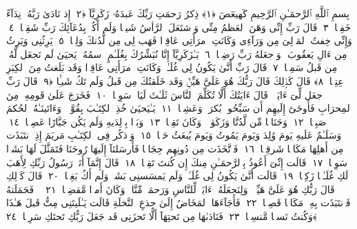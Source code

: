
  
    
  
    
    

\nopagebreak
  بِسمِ ٱللَّهِ ٱلرَّحمَـٰنِ ٱلرَّحِيمِ
  كٓهيعٓصٓ ﴿١﴾
 ذِكرُ رَحمَتِ رَبِّكَ عَبدَهُۥ زَكَرِيَّآ ﴿٢﴾
 إِذ نَادَىٰ رَبَّهُۥ نِدَآءً خَفِيًّۭا ﴿٣﴾
 قَالَ رَبِّ إِنِّى وَهَنَ ٱلعَظمُ مِنِّى وَٱشتَعَلَ ٱلرَّأسُ شَيبًۭا وَلَم أَكُنۢ بِدُعَآئِكَ رَبِّ شَقِيًّۭا ﴿٤﴾
 وَإِنِّى خِفتُ ٱلمَوَٟلِىَ مِن وَرَآءِى وَكَانَتِ ٱمرَأَتِى عَاقِرًۭا فَهَب لِى مِن لَّدُنكَ وَلِيًّۭا ﴿٥﴾
 يَرِثُنِى وَيَرِثُ مِن ءَالِ يَعقُوبَ ۖ وَٱجعَلهُ رَبِّ رَضِيًّۭا ﴿٦﴾
 يَـٰزَكَرِيَّآ إِنَّا نُبَشِّرُكَ بِغُلَـٰمٍ ٱسمُهُۥ يَحيَىٰ لَم نَجعَل لَّهُۥ مِن قَبلُ سَمِيًّۭا ﴿٧﴾
 قَالَ رَبِّ أَنَّىٰ يَكُونُ لِى غُلَـٰمٌۭ وَكَانَتِ ٱمرَأَتِى عَاقِرًۭا وَقَد بَلَغتُ مِنَ ٱلكِبَرِ عِتِيًّۭا ﴿٨﴾
 قَالَ كَذَٟلِكَ قَالَ رَبُّكَ هُوَ عَلَىَّ هَيِّنٌۭ وَقَد خَلَقتُكَ مِن قَبلُ وَلَم تَكُ شَيـًۭٔا ﴿٩﴾
 قَالَ رَبِّ ٱجعَل لِّىٓ ءَايَةًۭ ۚ قَالَ ءَايَتُكَ أَلَّا تُكَلِّمَ ٱلنَّاسَ ثَلَـٰثَ لَيَالٍۢ سَوِيًّۭا ﴿١٠﴾
 فَخَرَجَ عَلَىٰ قَومِهِۦ مِنَ ٱلمِحرَابِ فَأَوحَىٰٓ إِلَيهِم أَن سَبِّحُوا۟ بُكرَةًۭ وَعَشِيًّۭا ﴿١١﴾
 يَـٰيَحيَىٰ خُذِ ٱلكِتَـٰبَ بِقُوَّةٍۢ ۖ وَءَاتَينَـٰهُ ٱلحُكمَ صَبِيًّۭا ﴿١٢﴾
 وَحَنَانًۭا مِّن لَّدُنَّا وَزَكَوٰةًۭ ۖ وَكَانَ تَقِيًّۭا ﴿١٣﴾
 وَبَرًّۢا بِوَٟلِدَيهِ وَلَم يَكُن جَبَّارًا عَصِيًّۭا ﴿١٤﴾
 وَسَلَـٰمٌ عَلَيهِ يَومَ وُلِدَ وَيَومَ يَمُوتُ وَيَومَ يُبعَثُ حَيًّۭا ﴿١٥﴾
 وَٱذكُر فِى ٱلكِتَـٰبِ مَريَمَ إِذِ ٱنتَبَذَت مِن أَهلِهَا مَكَانًۭا شَرقِيًّۭا ﴿١٦﴾
 فَٱتَّخَذَت مِن دُونِهِم حِجَابًۭا فَأَرسَلنَآ إِلَيهَا رُوحَنَا فَتَمَثَّلَ لَهَا بَشَرًۭا سَوِيًّۭا ﴿١٧﴾
 قَالَت إِنِّىٓ أَعُوذُ بِٱلرَّحمَـٰنِ مِنكَ إِن كُنتَ تَقِيًّۭا ﴿١٨﴾
 قَالَ إِنَّمَآ أَنَا۠ رَسُولُ رَبِّكِ لِأَهَبَ لَكِ غُلَـٰمًۭا زَكِيًّۭا ﴿١٩﴾
 قَالَت أَنَّىٰ يَكُونُ لِى غُلَـٰمٌۭ وَلَم يَمسَسنِى بَشَرٌۭ وَلَم أَكُ بَغِيًّۭا ﴿٢٠﴾
 قَالَ كَذَٟلِكِ قَالَ رَبُّكِ هُوَ عَلَىَّ هَيِّنٌۭ ۖ وَلِنَجعَلَهُۥٓ ءَايَةًۭ لِّلنَّاسِ وَرَحمَةًۭ مِّنَّا ۚ وَكَانَ أَمرًۭا مَّقضِيًّۭا ﴿٢١﴾
 ۞ فَحَمَلَتهُ فَٱنتَبَذَت بِهِۦ مَكَانًۭا قَصِيًّۭا ﴿٢٢﴾
 فَأَجَآءَهَا ٱلمَخَاضُ إِلَىٰ جِذعِ ٱلنَّخلَةِ قَالَت يَـٰلَيتَنِى مِتُّ قَبلَ هَـٰذَا وَكُنتُ نَسيًۭا مَّنسِيًّۭا ﴿٢٣﴾
 فَنَادَىٰهَا مِن تَحتِهَآ أَلَّا تَحزَنِى قَد جَعَلَ رَبُّكِ تَحتَكِ سَرِيًّۭا ﴿٢٤﴾
